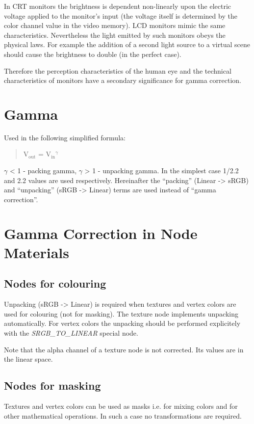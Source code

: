 \documentclass[a4paper,12pt,oneside]{sphinxmanual}
\begin{document}
In CRT monitors the brightness is dependent non-linearly upon the electric voltage applied to the monitor's input (the voltage itself is determined by the color channel value in the video memory). LCD monitors mimic the same characteristics. Nevertheless the light emitted by such monitors obeys the physical laws. For example the addition of a second light source to a virtual scene should cause the brightness to double (in the perfect case).

Therefore the perception characteristics of the human eye and the technical characteristics of monitors have a secondary significance for gamma correction.


\section{Gamma}
\label{gamma_alpha:id4}
Used in the following simplified formula:
\begin{quote}

V$_{\text{out}}$ = V$_{\text{in}}$$^{\text{\(\gamma\)}}$
\end{quote}

\(\gamma\) \textless{} 1 - packing gamma, \(\gamma\) \textgreater{} 1 - unpacking gamma. In the simplest case 1/2.2 and 2.2 values are used respectively. Hereinafter the ``packing'' (Linear -\textgreater{} sRGB) and ``unpacking'' (sRGB -\textgreater{} Linear) terms are used instead of ``gamma correction''.


\section{Gamma Correction in Node Materials}
\label{gamma_alpha:gamma-nodes}\label{gamma_alpha:id5}

\subsection{Nodes for colouring}
\label{gamma_alpha:id6}
Unpacking (sRGB -\textgreater{} Linear) is required when textures and vertex colors are used for colouring (not for masking). The texture node implements unpacking automatically. For vertex colors the unpacking should be performed explicitely with the \emph{SRGB\_TO\_LINEAR} special node.

Note that the alpha channel of a texture node is not corrected. Its values are in the linear space.


\subsection{Nodes for masking}
\label{gamma_alpha:id7}
Textures and vertex colors can be used as masks i.e. for mixing colors and for other mathematical operations. In such a case no transformations are required.
\end{document}
